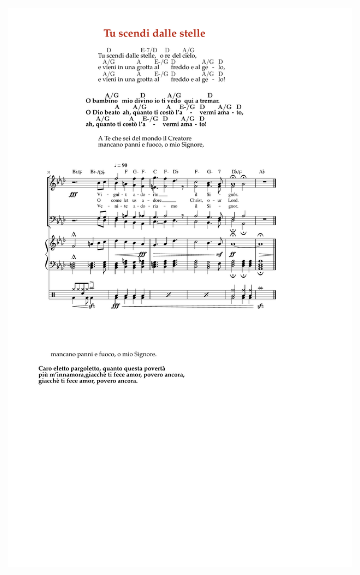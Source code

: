 \begin{figure}[!h]
  \captionsetup[subfigure]{labelformat=empty}
    \centering
    \begin{subfigure}[b]{0.4\textwidth}
        \includegraphics[width=\textwidth]{img/accordi}
    \end{subfigure}~
    \begin{subfigure}[b]{0.6\textwidth}

\end{subfigure}
\end{figure}
